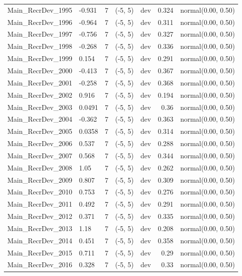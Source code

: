\documentclass[
]{scrartcl}
\begin{document}
\begin{landscape}
\begin{longtable}{llrllrl}
Main\_RecrDev\_1995 & -0.931 & 7 & (-5, 5) & dev & 0.324 & normal(0.00, 0.50) \\ 
Main\_RecrDev\_1996 & -0.964 & 7 & (-5, 5) & dev & 0.311 & normal(0.00, 0.50) \\ 
Main\_RecrDev\_1997 & -0.756 & 7 & (-5, 5) & dev & 0.327 & normal(0.00, 0.50) \\ 
Main\_RecrDev\_1998 & -0.268 & 7 & (-5, 5) & dev & 0.336 & normal(0.00, 0.50) \\ 
Main\_RecrDev\_1999 & 0.154 & 7 & (-5, 5) & dev & 0.291 & normal(0.00, 0.50) \\ 
Main\_RecrDev\_2000 & -0.413 & 7 & (-5, 5) & dev & 0.367 & normal(0.00, 0.50) \\ 
Main\_RecrDev\_2001 & -0.258 & 7 & (-5, 5) & dev & 0.368 & normal(0.00, 0.50) \\ 
Main\_RecrDev\_2002 & 0.916 & 7 & (-5, 5) & dev & 0.194 & normal(0.00, 0.50) \\ 
Main\_RecrDev\_2003 & 0.0491 & 7 & (-5, 5) & dev & 0.36 & normal(0.00, 0.50) \\ 
Main\_RecrDev\_2004 & -0.362 & 7 & (-5, 5) & dev & 0.363 & normal(0.00, 0.50) \\ 
Main\_RecrDev\_2005 & 0.0358 & 7 & (-5, 5) & dev & 0.314 & normal(0.00, 0.50) \\ 
Main\_RecrDev\_2006 & 0.537 & 7 & (-5, 5) & dev & 0.288 & normal(0.00, 0.50) \\ 
Main\_RecrDev\_2007 & 0.568 & 7 & (-5, 5) & dev & 0.344 & normal(0.00, 0.50) \\ 
Main\_RecrDev\_2008 & 1.05 & 7 & (-5, 5) & dev & 0.262 & normal(0.00, 0.50) \\ 
Main\_RecrDev\_2009 & 0.807 & 7 & (-5, 5) & dev & 0.309 & normal(0.00, 0.50) \\ 
Main\_RecrDev\_2010 & 0.753 & 7 & (-5, 5) & dev & 0.276 & normal(0.00, 0.50) \\ 
Main\_RecrDev\_2011 & 0.492 & 7 & (-5, 5) & dev & 0.291 & normal(0.00, 0.50) \\ 
Main\_RecrDev\_2012 & 0.371 & 7 & (-5, 5) & dev & 0.335 & normal(0.00, 0.50) \\ 
Main\_RecrDev\_2013 & 1.18 & 7 & (-5, 5) & dev & 0.208 & normal(0.00, 0.50) \\ 
Main\_RecrDev\_2014 & 0.451 & 7 & (-5, 5) & dev & 0.358 & normal(0.00, 0.50) \\ 
Main\_RecrDev\_2015 & 0.711 & 7 & (-5, 5) & dev & 0.29 & normal(0.00, 0.50) \\ 
Main\_RecrDev\_2016 & 0.328 & 7 & (-5, 5) & dev & 0.33 & normal(0.00, 0.50) \\ 

\end{longtable}
\end{landscape}
\end{document}
